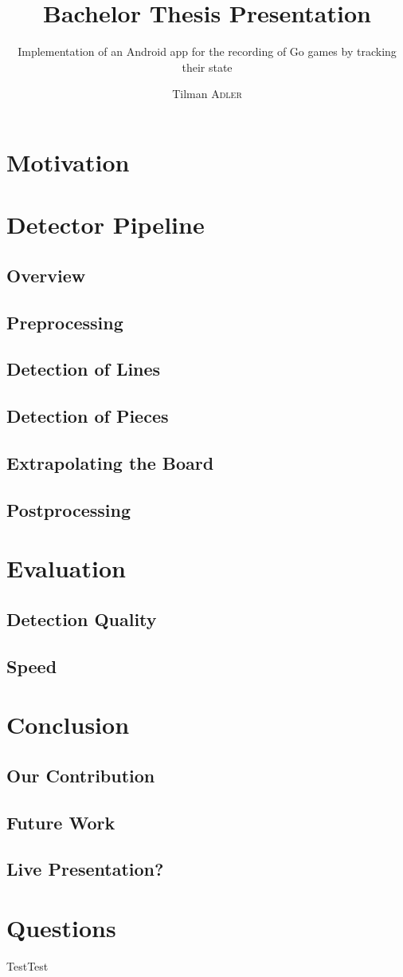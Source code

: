 \documentclass[table]{beamer}
\title[Short Title]{Bachelor Thesis Presentation}
\subtitle[Short Subtitle]{ Implementation of an Android app for the recording of Go games by tracking their state}
\institute{Pattern Recognition Lab (CS 5)}
\author{Tilman \textsc{Adler}}
\begin{document}
\frame[plain]{\titlepage}

\frame{\tableofcontents[currentsection]}

\section{Motivation}

\section{Detector Pipeline}
\subsection{Overview}
\subsection{Preprocessing}
\subsection{Detection of Lines}
\subsection{Detection of Pieces}
\subsection{Extrapolating the Board}
\subsection{Postprocessing}

\section{Evaluation}
\subsection{Detection Quality}
\subsection{Speed}

\section{Conclusion}
\subsection{Our Contribution}
\subsection{Future Work}
\subsection{Live Presentation?}

\section{Questions}

\begin{frame}{Test}{Test}

\end{frame}
\end{document}
